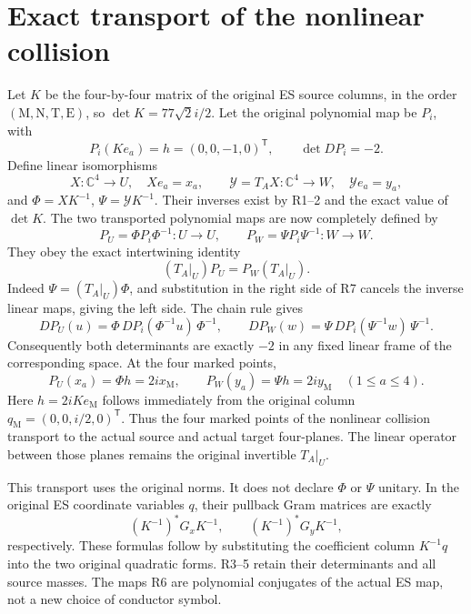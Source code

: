 \documentclass[11pt]{article}
\newcommand{\C}{\mathbb C}
\begin{document}
\section{Exact transport of the nonlinear collision}
Let $K$ be the four-by-four matrix of the original ES source columns,
in the order $(\mathrm M,\mathrm N,\mathrm T,\mathrm E)$, so
$\det K=77\sqrt2 i/2$. Let the original polynomial map be $P_i$,
with
\[
 P_i(Ke_a)=h=(0,0,-1,0)^{\mathsf T},\qquad \det DP_i=-2.
\]
Define linear isomorphisms
\[
 X:\C^4\longrightarrow U,\quad Xe_a=x_a,\qquad
 \mathcal Y=T_A X:\C^4\longrightarrow W,\quad\mathcal Ye_a=y_a,
\]
and $\Phi=XK^{-1}$, $\Psi=\mathcal YK^{-1}$. Their inverses exist
by R1--2 and the exact value of $\det K$. The two transported
polynomial maps are now completely defined by
\begin{equation}
 P_U=\Phi P_i\Phi^{-1}:U\longrightarrow U,\qquad
 P_W=\Psi P_i\Psi^{-1}:W\longrightarrow W.\tag{R6}
\end{equation}
They obey the exact intertwining identity
\begin{equation}
 (T_A|_U)P_U=P_W(T_A|_U).\tag{R7}
\end{equation}
Indeed $\Psi=(T_A|_U)\Phi$, and substitution in the right side of
R7 cancels the inverse linear maps, giving the left side.
The chain rule gives
\[
 DP_U(u)=\Phi\,DP_i(\Phi^{-1}u)\,\Phi^{-1},\qquad
 DP_W(w)=\Psi\,DP_i(\Psi^{-1}w)\,\Psi^{-1}.
\]
Consequently both determinants are exactly $-2$ in any fixed linear
frame of the corresponding space. At the four marked points,
\begin{equation}
 P_U(x_a)=\Phi h=2i x_{\mathrm M},\qquad
 P_W(y_a)=\Psi h=2i y_{\mathrm M}\quad(1\le a\le4).
 \tag{R8}
\end{equation}
Here $h=2iKe_{\mathrm M}$ follows immediately from the original
column $q_{\mathrm M}=(0,0,i/2,0)^{\mathsf T}$. Thus the four marked
points of the nonlinear collision transport to the actual
source and actual target four-planes. The linear operator between
those planes remains the original invertible $T_A|_U$.

This transport uses the original norms. It does not declare $\Phi$ or
$\Psi$ unitary. In the original ES coordinate variables $q$, their
pullback Gram matrices are exactly
\[
 (K^{-1})^*G_xK^{-1},\qquad (K^{-1})^*G_yK^{-1},
\]
respectively. These formulas follow by substituting the coefficient
column $K^{-1}q$ into the two original quadratic forms. R3--5 retain
their determinants and all source masses. The maps R6 are polynomial
conjugates of the actual ES map, not a new choice of conductor symbol.
\end{document}
